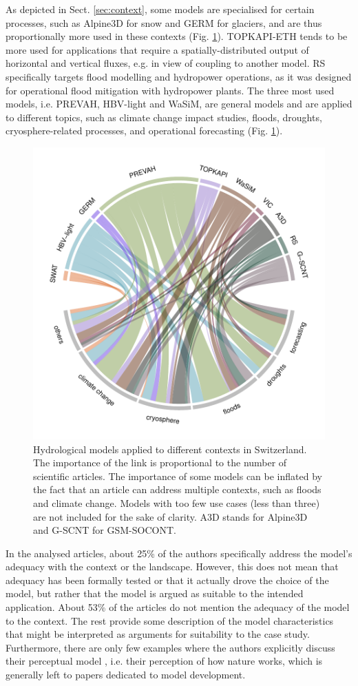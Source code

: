 \documentclass[10pt,a4paper]{article}
\begin{document}
As depicted in Sect. \ref{sec:context}, some models are specialised for certain processes, such as Alpine3D for snow and GERM for glaciers, and are thus proportionally more used in these contexts (Fig. \ref{fig:applications}). TOPKAPI-ETH tends to be more used for applications that require a spatially-distributed output of horizontal and vertical fluxes, e.g. in view of coupling to another model. RS specifically targets flood modelling and hydropower operations, as it was designed for operational flood mitigation with hydropower plants. The three most used models, i.e. PREVAH, HBV-light and WaSiM, are general models and are applied to different topics, such as climate change impact studies, floods, droughts, cryosphere-related processes, and operational forecasting (Fig. \ref{fig:applications}).

\begin{figure}[htb]
	\begin{center}
		\includegraphics[width=0.70\columnwidth]{figures/chord_diagram_contexts}
		\caption{{Hydrological models applied to different contexts in Switzerland. The importance of the link is proportional to the number of scientific articles. The importance of some models can be inflated by the fact that an article can address multiple contexts, such as floods and climate change. Models with too few use cases (less than three) are not included for the sake of clarity. A3D stands for Alpine3D and G-SCNT for GSM-SOCONT. 
		{\label{fig:applications}}
		}}
	\end{center}
\end{figure}

In the analysed articles, about 25\% of the authors specifically address the model's adequacy with the context or the landscape. However, this does not mean that adequacy has been formally tested or that it actually drove the choice of the model, but rather that the model is argued as suitable to the intended application. About 53\% of the articles do not mention the adequacy of the model to the context. The rest provide some description of the model characteristics that might be interpreted as arguments for suitability to the case study. Furthermore, there are only few examples where the authors explicitly discuss their perceptual model \citep{Beven2021}, i.e. their perception of how nature works, which is generally left to papers dedicated to model development.
\end{document}
